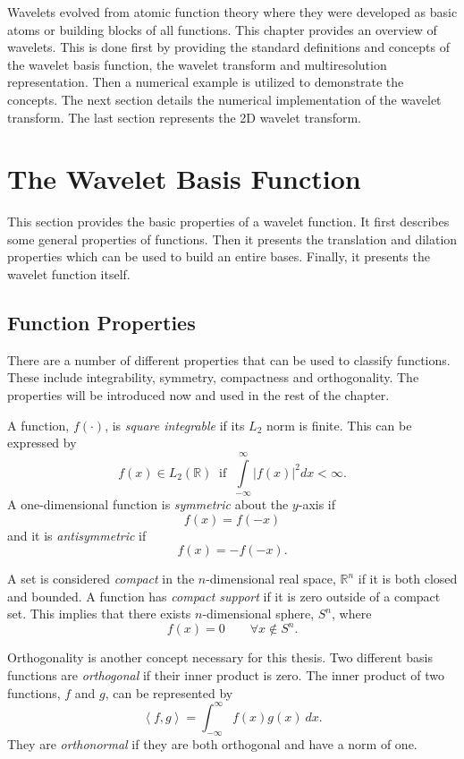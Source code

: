 Wavelets evolved from atomic function theory where they were developed
as basic atoms or building blocks of all functions. This chapter
provides an overview of wavelets. This is done first by providing the
standard definitions and concepts of the wavelet basis function, the
wavelet transform and multiresolution representation. Then a numerical
example is utilized to demonstrate the concepts. The next section
details the numerical implementation of the wavelet transform. The
last section represents the 2D wavelet transform.

\section{The Wavelet Basis Function}

This section provides the basic properties of a wavelet function. It
first describes some general properties of functions. Then it presents
the translation and dilation properties which can be used to build an
entire bases. Finally, it presents the wavelet function itself.

\subsection{Function Properties}

There are a number of different properties that can be used to
classify functions. These include integrability, symmetry, compactness
and orthogonality. The properties will be introduced now and used in
the rest of the chapter.

A function, $f(\cdot)$, is {\it square integrable} if its $L_2$ norm is finite. This can be
expressed by
\[ 
f(x) \in L_2({\mathbb R}) \ \mbox{ if } \ \int\limits _{-\infty}^{\infty} \left|f(x)\right|^2 dx < \infty.
\]
A one-dimensional function is {\it symmetric} about the $y$-axis if 
\[
f(x) = f(-x)
\]
and it is {\it antisymmetric} if
\[
f(x) = -f(-x).
\]

A set is considered {\it compact} in the $n$-dimensional real space,
${\mathbb R}^n$ if it is both closed and bounded. A function has {\it
compact support} if it is zero outside of a compact set. This implies that
there exists $n$-dimensional sphere, $S^n$, where 
\[
f(x) = 0 \qquad \forall x \not \in S^n.
\]

Orthogonality is another concept necessary for this thesis.  Two different basis functions are {\it orthogonal} if their inner product is zero.  The inner product of two functions, $f$ and $g$, can be represented by
\[
\left< f, g \right> = \int_{-\infty}^\infty f(x)g(x) \ dx.
\]
They are {\it orthonormal} if they are both orthogonal and have a norm of one.

